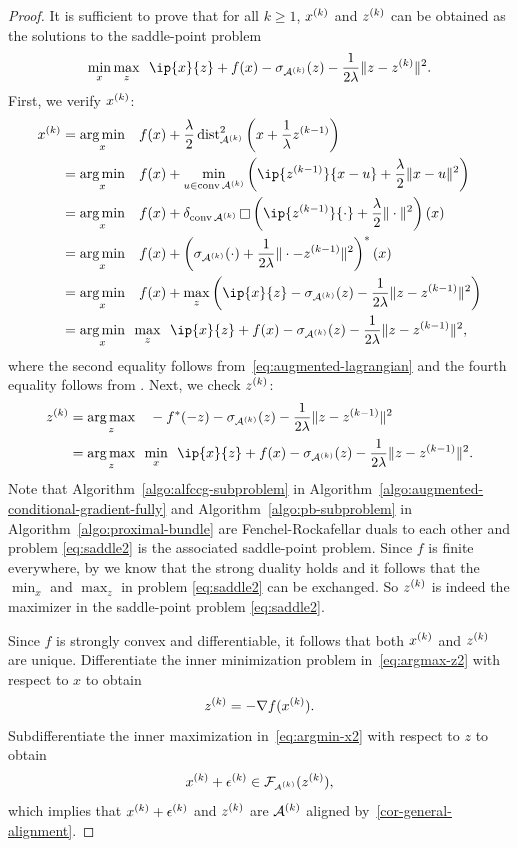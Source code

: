 \begin{proof}
  It is sufficient to prove that for all $k\geq1$, $x^{(k)}$ and $z^{(k)}$ can be
   obtained as the solutions to the saddle-point problem
   \begin{equation} \label{eq:saddle2}
     \min_{x}\max_{z}\enspace \ip{x}{z} + f(x) -  \sigma_{\Ascr\k}(z) - \frac{1}{2\lambda}\|z - z\k\|^2.
   \end{equation}
   First, we verify $x^{(k)}$:
   \begin{align}
     x\k &= \argmin{x} \enspace f(x) + \frac{\lambda}{2}\dist_{\Ascr\k}^2\left(x + \frac{1}{\lambda}z\km1\right)\nonumber
         \\&= \argmin{x} \enspace f(x) + \min_{u \in \conv\Ascr\k} \bigg(\ip{z\km1}{x - u} + \frac{\lambda}{2}\|x - u\|^2\bigg)\nonumber
         \\&= \argmin{x} \enspace f(x) + \delta_{\conv\Ascr\k}\infc\left(\ip{z\km1}{\cdot} + \frac{\lambda}{2}\|\cdot\|^2\right)(x)\nonumber
         \\&= \argmin{x} \enspace f(x) + \left(\sigma_{\Ascr\k}(\cdot) + \frac{1}{2\lambda}\|\cdot - z\km1\|^2\right)^*(x)\nonumber
         \\&= \argmin{x} \enspace f(x) + \max_z\left(\ip{x}{z} -  \sigma_{\Ascr\k}(z) - \frac{1}{2\lambda}\|z - z\km1\|^2\right)\nonumber
         \\&= \argmin{x} \max_z \enspace \ip{x}{z} + f(x) -  \sigma_{\Ascr\k}(z) - \frac{1}{2\lambda}\|z - z\km1\|^2 \label{eq:argmin-x2},
   \end{align}
   where the second equality follows from~\eqref{eq:augmented-lagrangian} and the
   fourth equality follows from \citet[Theorem~16.4]{rockafellar1970convex}. Next, we check $z^{(k)}$:
   \begin{align}
     z\k &= \argmax{z} \enspace -f^*(-z) - \sigma_{\Ascr\k}(z) - \frac{1}{2\lambda}\|z - z\km1\|^2\nonumber
         \\&= \argmax{z} \min_x\enspace \ip{x}{z} + f(x) - \sigma_{\Ascr\k}(z) - \frac{1}{2\lambda}\|z - z\km1\|^2\label{eq:argmax-z2}.
   \end{align}
   Note that Algorithm~\ref{algo:alfccg-subproblem} in Algorithm~\ref{algo:augmented-conditional-gradient-fully} and Algorithm~\ref{algo:pb-subproblem} in Algorithm~\ref{algo:proximal-bundle} are Fenchel-Rockafellar duals to each other and problem \eqref{eq:saddle2} is the associated saddle-point problem. Since $f$ is finite everywhere, by \cite[Theorem~31.1]{rockafellar1970convex} we know that the strong duality holds and it follows that the $\min_x$ and $\max_z$ in problem \eqref{eq:saddle2} can be exchanged. So $z^{(k)}$ is indeed the maximizer in the saddle-point problem \eqref{eq:saddle2}.
 
   Since $f$ is strongly convex and differentiable, it follows that both $x^{(k)}$ and $z^{(k)}$ are unique. Differentiate the inner minimization problem in~\eqref{eq:argmax-z2} with
   respect to $x$ to obtain 
   \[z^{(k)} = -\nabla f(x^{(k)}).\]
   Subdifferentiate the inner maximization in~\eqref{eq:argmin-x2} with respect to $z$ to obtain
   \[x^{(k)} + \epsilon^{(k)} \in \mathcal{F}_{\scriptscriptstyle \mathcal{A}^{(k)}}(z^{(k)}),\] which implies that $x^{(k)} + \epsilon^{(k)}$ and $z^{(k)}$ are $\mathcal{A}^{(k)}$ aligned by~\autoref{cor-general-alignment}.
 \end{proof}


